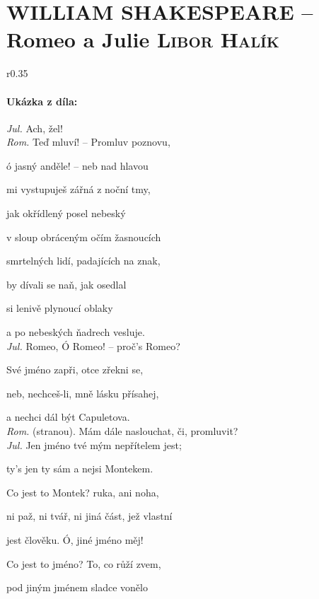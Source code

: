 \documentclass[A4paper]{extarticle} %
\begin{document}
\newpage


\changefontsize{8pt}

\part*{WILLIAM SHAKESPEARE -- Romeo a Julie {\hfill \normalfont\tiny\textsc{Libor Halík}}}

\noindent\begin{wrapfigure}{r}{0.35\textwidth}
\tiny

\subsection*{Ukázka z díla:}
\setlength{\parindent}{3pt}
\noindent \textit{Jul.} Ach, žel! \\
\textit{Rom.} Teď mluví! -- Promluv poznovu, \par
ó jasný anděle! -- neb nad hlavou \par
mi vystupuješ zářná z noční tmy, \par
jak okřídlený posel nebeský \par
v sloup obráceným očím žasnoucích \par
smrtelných lidí, padajících na znak, \par
by dívali se naň, jak osedlal \par
si lenivě plynoucí oblaky \par
a po nebeských ňadrech vesluje. \\
\textit{Jul.} Romeo, Ó Romeo! -- proč's Romeo? \par
Své jméno zapři, otce zřekni se, \par
neb, nechceš-li, mně lásku přísahej, \par
a nechci dál být Capuletova. \\
\textit{Rom.} (stranou). Mám dále naslouchat, či, promluvit? \\
\textit{Jul.} Jen jméno tvé mým nepřítelem jest; \par
ty's jen ty sám a nejsi Montekem. \par
Co jest to Montek? ruka, ani noha, \par
ni paž, ni tvář, ni jiná část, jež vlastní \par
jest člověku. Ó, jiné jméno měj! \par
Co jest to jméno? To, co růží zvem, \par
pod jiným jménem sladce vonělo \par

\end{wrapfigure}
\end{document}
